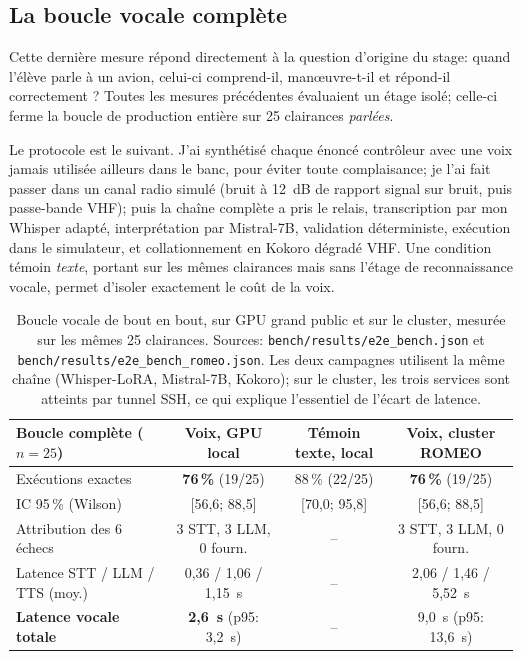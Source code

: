 \documentclass[11pt,a4paper]{article}
\begin{document}
\subsection{La boucle vocale complète}
\label{sec:res-e2e}

Cette dernière mesure répond directement à la question d'origine du stage: quand l'élève parle à un avion, celui-ci comprend-il, man\oe uvre-t-il et répond-il correctement ? Toutes les mesures précédentes évaluaient un étage isolé; celle-ci ferme la boucle de production entière sur 25 clairances \emph{parlées}.

Le protocole est le suivant. J'ai synthétisé chaque énoncé contrôleur avec une voix jamais utilisée ailleurs dans le banc, pour éviter toute complaisance; je l'ai fait passer dans un canal radio simulé (bruit à 12~dB de rapport signal sur bruit, puis passe-bande VHF); puis la chaîne complète a pris le relais, transcription par mon Whisper adapté, interprétation par Mistral-7B, validation déterministe, exécution dans le simulateur, et collationnement en Kokoro dégradé VHF. Une condition témoin \emph{texte}, portant sur les mêmes clairances mais sans l'étage de reconnaissance vocale, permet d'isoler exactement le coût de la voix. 

\begin{table}[!htbp]
\centering
\caption[Boucle vocale de bout en bout, sur GPU grand public et sur le cluster]{Boucle vocale de bout en bout, sur GPU grand public et sur le cluster, mesurée sur
les mêmes 25 clairances. Sources: \texttt{bench/results/e2e\_bench.json} et
\texttt{bench/results/e2e\_bench\_romeo.json}. Les deux campagnes utilisent la même chaîne
(Whisper-LoRA, Mistral-7B, Kokoro); sur le cluster, les trois services sont atteints par
tunnel SSH, ce qui explique l'essentiel de l'écart de latence.}
\label{tab:e2e}
\footnotesize
\setlength{\tabcolsep}{4pt}
\begin{tabular}{lccc}
\toprule
\rowcolor{lightgray}\textbf{Boucle complète ($n=25$)} & \textbf{Voix, GPU local} & \textbf{Témoin texte, local} & \textbf{Voix, cluster ROMEO}\\
\midrule
Exécutions exactes & \textbf{76\,\%} (19/25) & 88\,\% (22/25) & \textbf{76\,\%} (19/25)\\
IC 95\,\% (Wilson) & [56,6; 88,5] & [70,0; 95,8] & [56,6; 88,5]\\
Attribution des 6 échecs & 3 STT, 3 LLM, 0 fourn. & -- & 3 STT, 3 LLM, 0 fourn.\\
\midrule
Latence STT / LLM / TTS (moy.) & 0,36 / 1,06 / 1,15~s & -- & 2,06 / 1,46 / 5,52~s\\
\textbf{Latence vocale totale} & \textbf{2,6~s} (p95: 3,2~s) & -- & 9,0~s (p95: 13,6~s)\\
\bottomrule
\end{tabular}
\end{table}
\end{document}
